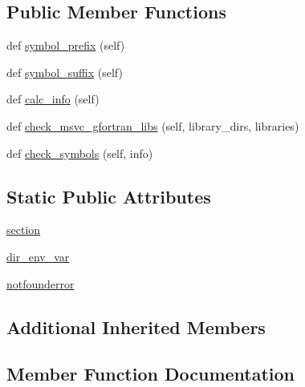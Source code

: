 \subsection*{Public Member Functions}
\begin{DoxyCompactItemize}
\item 
def \hyperlink{classnumpy_1_1distutils_1_1system__info_1_1openblas__info_aceb83e2a2c4329acd3a12cbbaeeff455}{symbol\+\_\+prefix} (self)
\item 
def \hyperlink{classnumpy_1_1distutils_1_1system__info_1_1openblas__info_a09101873f8192b6ae5dc53c26bdc08a6}{symbol\+\_\+suffix} (self)
\item 
def \hyperlink{classnumpy_1_1distutils_1_1system__info_1_1openblas__info_a077729061bcdb30380d1f0689adc5362}{calc\+\_\+info} (self)
\item 
def \hyperlink{classnumpy_1_1distutils_1_1system__info_1_1openblas__info_adf1234f0f4c772365d66817cc802ca1d}{check\+\_\+msvc\+\_\+gfortran\+\_\+libs} (self, library\+\_\+dirs, libraries)
\item 
def \hyperlink{classnumpy_1_1distutils_1_1system__info_1_1openblas__info_a96b8675c742c422d805adc24b8fef739}{check\+\_\+symbols} (self, info)
\end{DoxyCompactItemize}
\subsection*{Static Public Attributes}
\begin{DoxyCompactItemize}
\item 
\hyperlink{classnumpy_1_1distutils_1_1system__info_1_1openblas__info_a2bc495ea95d00bc68c3572f901e5b8f2}{section}
\item 
\hyperlink{classnumpy_1_1distutils_1_1system__info_1_1openblas__info_a6d48051739701ac64d1f90adffefa72a}{dir\+\_\+env\+\_\+var}
\item 
\hyperlink{classnumpy_1_1distutils_1_1system__info_1_1openblas__info_ad45757fe170f2a192b5190e256130699}{notfounderror}
\end{DoxyCompactItemize}
\subsection*{Additional Inherited Members}


\subsection{Member Function Documentation}
\mbox{\label{classnumpy_1_1distutils_1_1system__info_1_1openblas__info_a077729061bcdb30380d1f0689adc5362}} 
